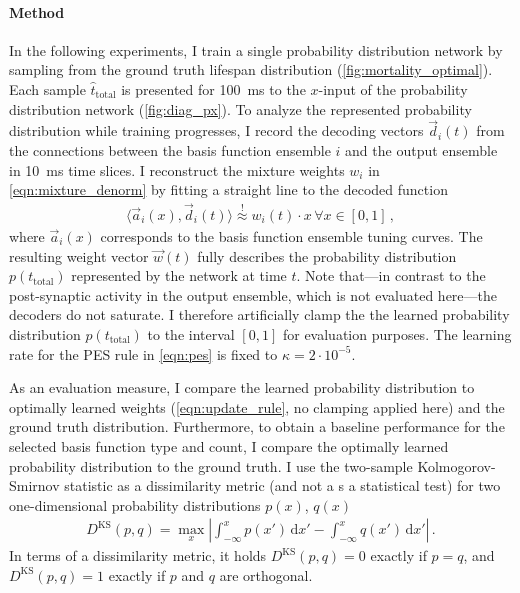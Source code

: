 \documentclass[a4paper,11pt]{article}
\begin{document}
\paragraph{Method}
In the following experiments, I train a single probability distribution network by sampling from the ground truth lifespan distribution (\cref{fig:mortality_optimal}). Each sample $\hat t_\mathrm{total}$ is presented for \SI{100}{\milli\second} to the $x$-input of the probability distribution network (\cref{fig:diag_px}). To analyze the represented probability distribution while training progresses, I record the decoding vectors $\vec d_i(t)$ from the connections between the basis function ensemble $i$ and the output ensemble in \SI{10}{\milli\second} time slices. I reconstruct the mixture weights $w_i$ in \cref{eqn:mixture_denorm} by fitting a straight line to the decoded function
\begin{align}
    \langle \vec a_i(x),  \vec d_i(t) \rangle \overset{!}\approx w_i(t) \cdot x \,\forall x \in [0, 1]\,,
\end{align}
where $\vec a_i(x)$ corresponds to the basis function ensemble tuning curves. The resulting weight vector $\vec w(t)$ fully describes the probability distribution $p(t_\mathrm{total})$ represented by the network at time $t$. Note that---in contrast to the post-synaptic activity in the output ensemble, which is not evaluated here---the decoders do not saturate. I therefore artificially clamp the the learned probability distribution $p(t_\mathrm{total})$ to the interval $[0, 1]$ for evaluation purposes. The learning rate for the PES rule in \cref{eqn:pes} is fixed to $\kappa = 2\cdot10^{-5}$.

As an evaluation measure, I compare the learned probability distribution to optimally learned weights (\cref{eqn:update_rule}, no clamping applied here) and the ground truth distribution. Furthermore, to obtain a baseline performance for the selected basis function type and count, I compare the optimally learned probability distribution to the ground truth. I use the two-sample Kolmogorov-Smirnov statistic \cite{massey1951kolmogorov} as a dissimilarity metric (and not a s a statistical test) for two one-dimensional probability distributions $p(x)$, $q(x)$
\begin{align}
    D^\mathrm{KS}(p, q) = \max_x
        \left| \int_{-\infty}^x p(x') \, \mathrm{d}x' - \int_{-\infty}^x q(x') \,\mathrm{d}x' \right| \,.
	\label{eqn:dks}
\end{align}
In terms of a dissimilarity metric, it holds $D^\mathrm{KS}(p, q) = 0$ exactly if $p = q$, and $D^\mathrm{KS}(p, q) = 1$ exactly if $p$ and $q$ are orthogonal.
\end{document}
